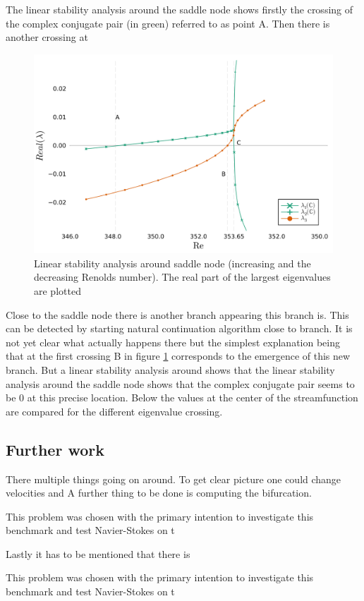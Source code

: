 The linear stability analysis around the saddle node shows firstly the crossing
of the complex conjugate pair (in green) referred to as point A. Then there is
another crossing at 

\begin{figure}[h!]
  \begin{center}
  \includegraphics[width=0.6*\textwidth]{figs/lsa_sn}
  \end{center}
  \label{fig:lsa}
  \caption{Linear stability analysis around saddle node (increasing and the decreasing Renolds number). The real
    part of the largest eigenvalues are plotted} 
\end{figure}

Close to the saddle node there is another branch appearing this branch is. This
can be detected by starting natural continuation algorithm close to branch. It
is not yet clear what actually happens there but the simplest explanation being
that at the first crossing B in figure \ref{fig:lsa} corresponds to the
emergence of this new branch. But a linear stability analysis around shows that
the linear stability analysis around the saddle node shows that the complex
conjugate pair seems to be 0 at this precise location. Below the values at the
center of the streamfunction are compared for the different eigenvalue crossing.



\subsection{Further work}

There multiple things going on around. To get clear picture one could change
velocities and A further thing to be done is computing the bifurcation. 




This problem was chosen with the primary intention to investigate this
benchmark and test Navier-Stokes on t 


Lastly it has to be mentioned that there is










This problem was chosen with the primary intention to investigate this
benchmark and test Navier-Stokes on t 





